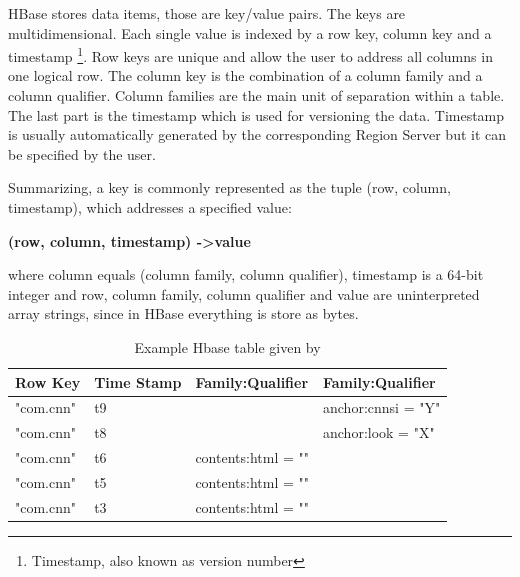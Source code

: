HBase stores data items, those are key/value pairs. The keys are multidimensional. Each single value is indexed by a row key, column key and a timestamp \footnote{Timestamp, also known as version number}. Row keys are unique and allow the user to address all columns in one logical row. The column key is the combination of a column family and a column qualifier. Column families are the main unit of separation within a table. The last part is the timestamp which is used for versioning the data. Timestamp is usually automatically generated by the corresponding Region Server but it can be specified by the user.
\par
Summarizing, a key is commonly represented as the tuple (row, column, timestamp), which addresses a specified value:

\bigskip

			\centerline{\textbf{(row, column, timestamp) -\textgreater value}}
\bigskip 

where column equals (column family, column qualifier), timestamp is a 64-bit integer and row, column family, column qualifier and value are uninterpreted array strings, since in HBase everything is store as bytes.

\begin{table}[htbp]
\begin{center}
\begin{tabular}{|l|l|l|l|}
\hline
\textbf{Row Key} & \textbf{Time Stamp} & \textbf{Family:Qualifier} & \textbf{Family:Qualifier} \\ \hline
"com.cnn" & t9 &   & anchor:cnnsi = "Y" \\ \hline
"com.cnn" & t8 &   & anchor:look = "X" \\ \hline
"com.cnn" & t6 & contents:html = "" &   \\ \cline{1-2}
"com.cnn" & t5 & contents:html = "" &   \\ \cline{1-2}
"com.cnn" & t3 & contents:html = "" &   \\ \hline
\end{tabular}
\caption{Example Hbase table given by \cite{ApacheHBaseDataModel}}
\end{center}
\end{table}


